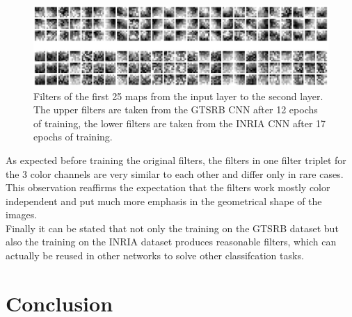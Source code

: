 \documentclass[11pt, a4paper]{article}
\begin{document}
\begin{figure}[h!]
	\centering
	\includegraphics[width=1\textwidth]{gtsrb_vs_inria_filters.png}
	\caption{Filters of the first 25 maps from the input layer to the second layer. The upper filters are taken from the GTSRB CNN after 12 epochs of training, the lower filters are taken from the INRIA CNN after 17 epochs of training.}
	\label{fig:gtsrb_vs_inria_filters}
\end{figure}

As expected before training the original filters, the filters in one filter triplet for the 3 color channels are very similar to each other and differ only in rare cases. This observation reaffirms the expectation that the filters work mostly color independent and put much more emphasis in the geometrical shape of the images.\\
Finally it can be stated that not only the training on the GTSRB dataset but also the training on the INRIA dataset produces reasonable filters, which can actually be reused in other networks to solve other classifcation tasks.


\section{Conclusion}
\end{document}
